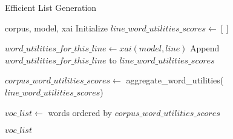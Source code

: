 \begin{algorithm}
\caption{Efficient List Generation}
\label{alg:efficient-list-generation}
\begin{algorithmic}[1]
\Require corpus, model, xai
\State Initialize $line\_word\_utilities\_scores \gets []$

    \State $word\_utilities\_for\_this\_line \gets xai(model, line)$
    \State Append $word\_utilities\_for\_this\_line$ to $line\_word\_utilities\_scores$
\EndFor

\State $corpus\_word\_utilities\_scores \gets$ aggregate\_word\_utilities($line\_word\_utilities\_scores$)

\State $voc\_list \gets$ words ordered by $corpus\_word\_utilities\_scores$

\State \Return $voc\_list$
\end{algorithmic}
\end{algorithm}
